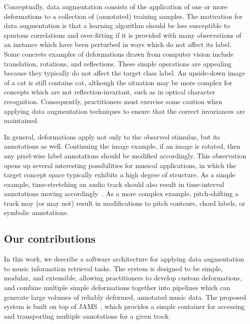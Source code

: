 \documentclass{article}
\begin{document}
Conceptually, data augmentation consists of the application of one or more deformations to
a collection of (annotated) training samples.  
The motivation for data augmentation is that a learning algorithm should be less
susceptible to spurious correlations and over-fitting if it is provided with many
observations of an instance which have been perturbed in ways which do not affect its
label.
Some concrete examples of deformations drawn from computer vision include translation, 
rotations, and reflections.  These simple operations are appealing because they typically 
do not affect the target class label. An upside-down image of a cat is still contains cat, 
although the situation may be more complex for concepts which are not reflection-invariant, 
such as in optical character recognition.  Consequently, practitioners must exercise some 
caution when applying data augmentation techniques to ensure that the correct invariances 
are maintained.

In general, deformations apply not only to the observed
stimulus, but its annotations as well.
Continuing the image example, if an image is rotated, then any pixel-wise 
label annotations should be modified accordingly.
This observation opens up several interesting possibilities for musical applications, in
which the target concept space typically exhibits a high degree of structure.
As a simple example, time-stretching an audio track should also result in time-interval
annotations moving accordingly~\cite{mauch2013audio}.  As a more complex example,
pitch-shifting a track may (or may not) result in modifications to pitch contours,
chord labels, or symbolic annotations.


\subsection{Our contributions}
In this work, we describe a software architecture for applying data augmentation to music
information retrieval tasks.  The system is designed to be simple, modular, and
extensible, allowing practitioners to develop custom deformations, and combine multiple
simple deformations together into pipelines which can generate large volumes of reliably
deformed, annotated music data.  The proposed system is built on top of
JAMS~\cite{humphreyjams}, which provides a simple container for accessing and
transporting multiple annotations for a given track.  
\end{document}

